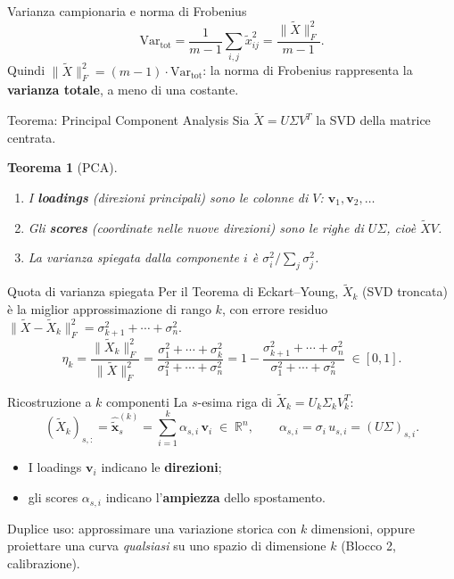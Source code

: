 \documentclass[11pt,aspectratio=169]{beamer}
\newcommand{\R}{\mathbb{R}}
\newtheorem{teorema}{Teorema}
\begin{document}
\begin{frame}{Varianza campionaria e norma di Frobenius}
\[
  \mathrm{Var}_{\mathrm{tot}} = \frac{1}{m-1}\sum_{i,j}\tilde x_{ij}^2
  = \frac{\|\tilde X\|_F^2}{m-1}.
\]
Quindi $\|\tilde X\|_F^2 = (m-1)\cdot \mathrm{Var}_{\mathrm{tot}}$: la norma di Frobenius
rappresenta la \textbf{varianza totale}, a meno di una costante.
\end{frame}

\begin{frame}{Teorema: Principal Component Analysis}
Sia $\tilde X = U\Sigma V^T$ la SVD della matrice centrata.
\begin{teorema}[PCA]
\begin{enumerate}
  \item I \textbf{loadings} (direzioni principali) sono le colonne di $V$:
        $\mathbf{v}_1,\mathbf{v}_2,\ldots$
  \item Gli \textbf{scores} (coordinate nelle nuove direzioni) sono le righe di $U\Sigma$,
        cioè $\tilde X V$.
  \item La varianza spiegata dalla componente $i$ è $\sigma_i^2/\sum_j\sigma_j^2$.
\end{enumerate}
\end{teorema}
\end{frame}

\begin{frame}{Quota di varianza spiegata}
Per il Teorema di Eckart--Young, $\tilde X_k$ (SVD troncata) è la miglior approssimazione di
rango $k$, con errore residuo $\|\tilde X - \tilde X_k\|_F^2 = \sigma_{k+1}^2+\cdots+\sigma_n^2$.
\[
  \eta_k = \frac{\|\tilde X_k\|_F^2}{\|\tilde X\|_F^2}
  = \frac{\sigma_1^2+\cdots+\sigma_k^2}{\sigma_1^2+\cdots+\sigma_n^2}
  = 1 - \frac{\sigma_{k+1}^2+\cdots+\sigma_n^2}{\sigma_1^2+\cdots+\sigma_n^2} \;\in [0,1].
\]
\end{frame}

\begin{frame}{Ricostruzione a $k$ componenti}
La $s$-esima riga di $\tilde X_k = U_k\Sigma_k V_k^T$:
\[
  (\tilde X_k)_{s,:} = \hat{\tilde{\mathbf{x}}}_s^{(k)}
  = \sum_{i=1}^{k} \alpha_{s,i}\,\mathbf{v}_i \;\in\; \R^n,
  \qquad \alpha_{s,i} = \sigma_i\,u_{s,i} = (U\Sigma)_{s,i}.
\]
\begin{itemize}
  \item I loadings $\mathbf{v}_i$ indicano le \textbf{direzioni};
  \item gli scores $\alpha_{s,i}$ indicano l'\textbf{ampiezza} dello spostamento.
\end{itemize}
Duplice uso: approssimare una variazione storica con $k$ dimensioni, oppure proiettare una
curva \emph{qualsiasi} su uno spazio di dimensione $k$ (Blocco 2, calibrazione).
\end{frame}
\end{document}
